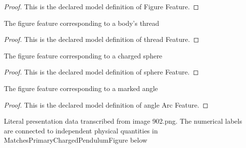 \begin{proof}
  This is the declared model definition of Figure Feature.
\end{proof}
\begin{definition}
  \label{def:physics:phyx-mini-0902:phyxminiproblems-problemphyxmini0902-threadfeature}
  The figure feature corresponding to a body's thread
\end{definition}
\begin{proof}
  This is the declared model definition of thread Feature.
\end{proof}
\begin{definition}
  \label{def:physics:phyx-mini-0902:phyxminiproblems-problemphyxmini0902-spherefeature}
  The figure feature corresponding to a charged sphere
\end{definition}
\begin{proof}
  This is the declared model definition of sphere Feature.
\end{proof}
\begin{definition}
  \label{def:physics:phyx-mini-0902:phyxminiproblems-problemphyxmini0902-anglearcfeature}
  The figure feature corresponding to a marked angle
\end{definition}
\begin{proof}
  This is the declared model definition of angle Arc Feature.
\end{proof}
\begin{definition}
  \label{def:physics:phyx-mini-0902:phyxminiproblems-problemphyxmini0902-symmetricchargedpendulumfigure}
  Literal presentation data transcribed from image 902.png. The numerical labels are connected to independent physical quantities in MatchesPrimaryChargedPendulumFigure below
\end{definition}
